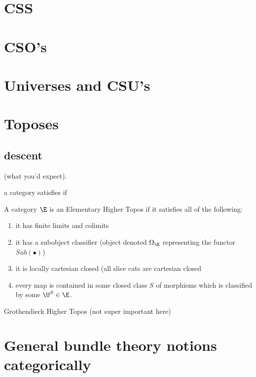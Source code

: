 \documentclass[./main.tex]{subfiles}
\begin{document}
  \section{CSS}
  \section{CSO's}
  \section{Universes and CSU's}
  \section{Toposes}
  \subsection{descent}
  \begin{definition}
     (what you'd expect).
    
  \end{definition}
\begin{definition}
  a category satisfies  if   
\end{definition}
  \begin{definition}
    A category $\E$ is an Elementary Higher Topos if it satisfies all of the following:
    \begin{enumerate}
      \item it has finite limits and colimits 
      \item it has a subobject classifier (object denoted $\Omega_\E$ representing the functor $Sub(\bullet)$)
      \item it is locally cartesian closed (all slice cats are cartesian closed
	\item  every map is contained in some closed class $S$  of morphisms which is classified by some $\U^S\in \E$.
    \end{enumerate}

  \end{definition}
  \begin{definition}
    Grothendieck Higher Topos (not super important here)

  \end{definition}
  \section{General bundle theory notions categorically}
\end{document}
